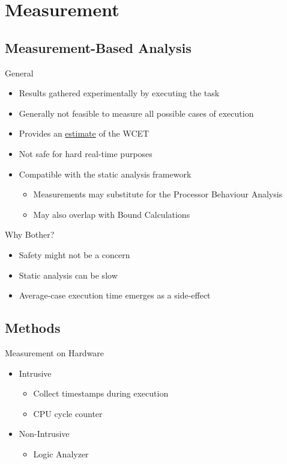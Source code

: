 \documentclass{beamer}
\begin{document}
\section{Measurement}
\subsection{Measurement-Based Analysis}
\begin{frame}{General}
  \begin{itemize}
    \item Results gathered experimentally by executing the task
    \item Generally not feasible to measure all possible cases of execution
    \item Provides an \underline{estimate} of the WCET
    \item Not safe for hard real-time purposes
      \pause
    \item Compatible with the static analysis framework
      \begin{itemize}
        \item Measurements may substitute for the Processor Behaviour Analysis
        \item May also overlap with Bound Calculations
      \end{itemize}
  \end{itemize}
\end{frame}

\begin{frame}{Why Bother?}
  \begin{itemize}
    \item Safety might not be a concern
    \item Static analysis can be slow
    \item Average-case execution time emerges as a side-effect
  \end{itemize}
\end{frame}

\subsection{Methods}
\begin{frame}{Measurement on Hardware}
  \begin{itemize}
    \item Intrusive
      \begin{itemize}
        \item Collect timestamps during execution
        \item CPU cycle counter
      \end{itemize}
    \item Non-Intrusive
      \begin{itemize}
        \item Logic Analyzer
      \end{itemize}
  \end{itemize}
\end{frame}
  
\end{document}
